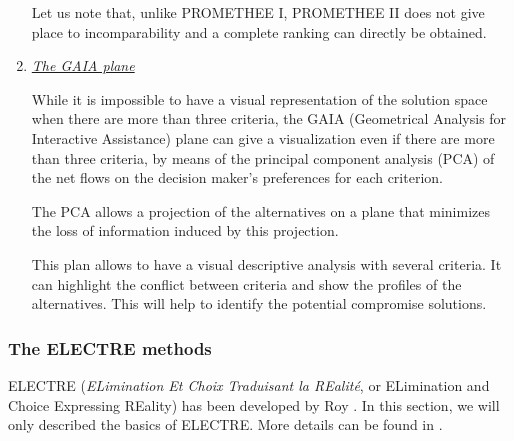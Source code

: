 \begin{enumerate}
Let us note that, unlike PROMETHEE I, PROMETHEE II does not give place to incomparability and a complete ranking can directly be obtained.

\item \textit{\underline{The GAIA plane}}

While it is impossible to have a visual representation of the solution space when there are more than three criteria, the GAIA (Geometrical Analysis for Interactive Assistance) plane can give a visualization even if there are more than three criteria, by means of the principal component analysis (PCA) of the net flows on the decision maker's preferences for each criterion.

The PCA allows a projection of the alternatives on a plane that minimizes the loss of information induced by this projection.

This plan allows to have a visual descriptive analysis with several criteria. It can highlight the conflict between criteria and show the profiles of the alternatives. This will help to identify the potential compromise solutions.
\end{enumerate}

\subsubsection{The ELECTRE methods}
ELECTRE (\textit{ELimination Et Choix Traduisant la REalité}, or ELimination and Choice Expressing REality) has been developed by Roy \cite{Roy66}. In this section, we will only described the basics of ELECTRE. More details can be found in \cite{electre}.

